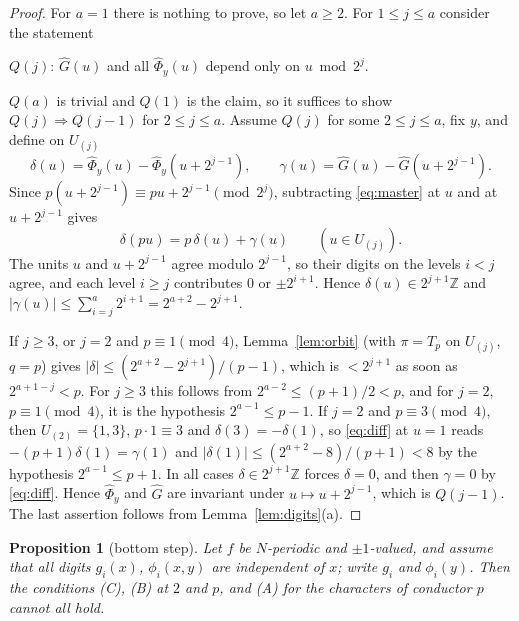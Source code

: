 \documentclass[11pt,a4paper]{article}
\newtheorem{proposition}[theorem]{Proposition}
\theoremstyle{definition}
\theoremstyle{remark}
\newcommand{\Z}{\mathbb{Z}}
\newcommand{\Ga}{\widehat G}
\newcommand{\Ph}{\widehat\Phi}
\newcommand{\Uu}[1]{U_{(#1)}}
\begin{document}
\begin{proof}
For $a=1$ there is nothing to prove, so let $a\ge2$. For $1\le j\le a$ consider the statement
\begin{center}
$Q(j)$: \quad $\Ga(u)$ and all $\Ph_y(u)$ depend only on $u\bmod 2^j$.
\end{center}
$Q(a)$ is trivial and $Q(1)$ is the claim, so it suffices to show $Q(j)\Rightarrow Q(j-1)$ for $2\le j\le a$. Assume $Q(j)$ for some $2\le j\le a$, fix $y$, and define on $\Uu j$
\[
\delta(u)=\Ph_y(u)-\Ph_y(u+2^{j-1}),\qquad \gamma(u)=\Ga(u)-\Ga(u+2^{j-1}).
\]
Since $p(u+2^{j-1})\equiv pu+2^{j-1}\pmod{2^j}$, subtracting \eqref{eq:master} at $u$ and at $u+2^{j-1}$ gives
\begin{equation}\label{eq:diff}
\delta(pu)=p\,\delta(u)+\gamma(u)\qquad(u\in\Uu j).
\end{equation}
The units $u$ and $u+2^{j-1}$ agree modulo $2^{j-1}$, so their digits on the levels $i<j$ agree, and each level $i\ge j$ contributes $0$ or $\pm2^{i+1}$. Hence $\delta(u)\in2^{j+1}\Z$ and $|\gamma(u)|\le\sum_{i=j}^a2^{i+1}=2^{a+2}-2^{j+1}$.

If $j\ge3$, or $j=2$ and $p\equiv1\pmod4$, Lemma~\ref{lem:orbit} (with $\pi=T_p$ on $\Uu j$, $q=p$) gives $|\delta|\le(2^{a+2}-2^{j+1})/(p-1)$, which is $<2^{j+1}$ as soon as $2^{a+1-j}<p$. For $j\ge3$ this follows from $2^{a-2}\le(p+1)/2<p$, and for $j=2$, $p\equiv1\pmod 4$, it is the hypothesis $2^{a-1}\le p-1$. If $j=2$ and $p\equiv3\pmod 4$, then $\Uu2=\{1,3\}$, $p\cdot1\equiv3$ and $\delta(3)=-\delta(1)$, so \eqref{eq:diff} at $u=1$ reads $-(p+1)\delta(1)=\gamma(1)$ and $|\delta(1)|\le(2^{a+2}-8)/(p+1)<8$ by the hypothesis $2^{a-1}\le p+1$. In all cases $\delta\in2^{j+1}\Z$ forces $\delta=0$, and then $\gamma=0$ by \eqref{eq:diff}. Hence $\Ph_y$ and $\Ga$ are invariant under $u\mapsto u+2^{j-1}$, which is $Q(j-1)$. The last assertion follows from Lemma~\ref{lem:digits}(a).
\end{proof}

\begin{proposition}[bottom step]\label{prop:bottom}
Let $f$ be $N$-periodic and $\pm1$-valued, and assume that all digits $g_i(x)$, $\phi_i(x,y)$ are independent of $x$; write $g_i$ and $\phi_i(y)$. Then the conditions \textup{(C)}, \textup{(B)} at $2$ and $p$, and \textup{(A)} for the characters of conductor $p$ cannot all hold.
\end{proposition}
\end{document}
